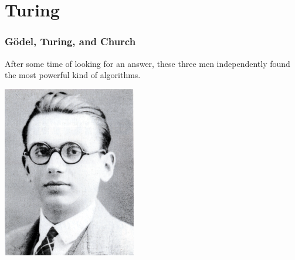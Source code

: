 \documentclass[mathserif]{beamer}
\begin{document}

\section{Turing}
\begin{frame}
  \frametitle{G\"odel, Turing, and Church}

  After some time of looking for an answer, these three men independently found
  the most powerful kind of algorithms.
  \begin{multicols}{3}
    \includegraphics[width=0.9\linewidth]{media/goedel-self.png}


\end{multicols}
\end{frame}
\end{document}

